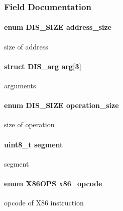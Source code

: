\subsubsection{Field Documentation}
\hypertarget{struct_d_i_s__fixed_a772bedb1977f1ae07b9f55991f318bd8}{
\paragraph[{address\-\_\-size}]{\setlength{\rightskip}{0pt plus 5cm}enum {\bf D\-I\-S\-\_\-\-S\-I\-Z\-E} address\-\_\-size}}\label{struct_d_i_s__fixed_a772bedb1977f1ae07b9f55991f318bd8}
size of address \hypertarget{struct_d_i_s__fixed_a0a83d2adc11b69512577cebc2bdc1aa8}{
\paragraph[{arg}]{\setlength{\rightskip}{0pt plus 5cm}struct {\bf D\-I\-S\-\_\-arg} arg\mbox{[}3\mbox{]}}}\label{struct_d_i_s__fixed_a0a83d2adc11b69512577cebc2bdc1aa8}
arguments \hypertarget{struct_d_i_s__fixed_a1a17e54c88513da8e5b1175a785c51ae}{
\paragraph[{operation\-\_\-size}]{\setlength{\rightskip}{0pt plus 5cm}enum {\bf D\-I\-S\-\_\-\-S\-I\-Z\-E} operation\-\_\-size}}\label{struct_d_i_s__fixed_a1a17e54c88513da8e5b1175a785c51ae}
size of operation \hypertarget{struct_d_i_s__fixed_afbf231e07d12db4d0ebf0bc223679ae5}{
\paragraph[{segment}]{\setlength{\rightskip}{0pt plus 5cm}uint8\-\_\-t segment}}\label{struct_d_i_s__fixed_afbf231e07d12db4d0ebf0bc223679ae5}
segment \hypertarget{struct_d_i_s__fixed_a372354efff5b025dc9324a03625338a2}{
\paragraph[{x86\-\_\-opcode}]{\setlength{\rightskip}{0pt plus 5cm}enum {\bf X86\-O\-P\-S} x86\-\_\-opcode}}\label{struct_d_i_s__fixed_a372354efff5b025dc9324a03625338a2}
opcode of X86 instruction 